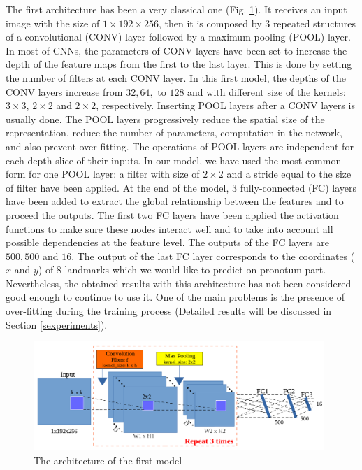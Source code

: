 \documentclass[review]{elsarticle}
\begin{document}
The first architecture has been a very classical one
(Fig. \ref{fignet1}). It receives an input image with the size of $1
\times 192 \times 256$, then it is composed by $3$ repeated structures
of a convolutional (CONV) layer followed by a maximum pooling (POOL)
layer. In most of CNNs, the parameters of CONV layers have been set to
increase the depth of the feature maps from the first  to the last
layer. This is done by setting the number of filters at each CONV
layer. In this first model, the depths of the CONV layers increase
from $32, 64, $ to $128$ and with different size of the kernels: $3
\times 3$, $2 \times 2$ and $2 \times 2$, respectively. Inserting POOL
layers after a CONV layers is usually done. The POOL layers
progressively reduce the spatial size of the representation, reduce
the number of parameters, computation in the network, and also prevent over-fitting. The operations of POOL layers are independent
for each depth slice of their inputs. In our model, we have used the
most common form for one POOL layer: a filter with size of $2 \times
2$ and a stride equal to the size of filter have been applied. At the
end of the model, $3$ fully-connected (FC) layers have been added to extract the global
relationship between the features and to proceed the outputs. The
first two FC layers have been applied the activation functions to make
sure these nodes interact well and to take into account all possible
dependencies at the feature level. The outputs of the FC layers are
$500, 500$ and $16$. The output of the last FC layer corresponds to
the coordinates ($x$ and $y$) of $8$ landmarks which we would like to
predict on pronotum part. Nevertheless, the obtained results with this
architecture has not been considered good enough to continue to use
it. One of the main problems is the presence of over-fitting during
the training process (Detailed results will be discussed in Section
\ref{sexperiments}).

\begin{figure}[!h]
	\centering
	\includegraphics[width=0.98\textwidth]{images/model1}
	\caption{The architecture of the first model}
	\label{fignet1}
\end{figure}
\end{document}
